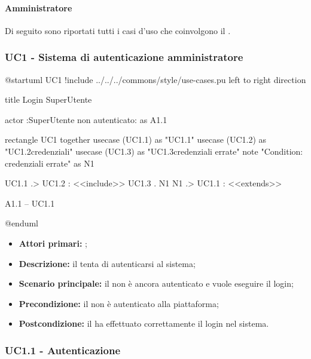 \documentclass[../analisi-dei-requisiti]{subfiles}
\begin{document}
\paragraph{Amministratore}
\label{par:amministratore}
Di seguito sono riportati tutti i casi d'uso che coinvolgono il  .


\subsubsection{UC1 - Sistema di autenticazione amministratore}
\label{subsub:UC1}


\begin{plantuml}
@startuml UC1
!include ../../../commons/style/use-cases.pu
left to right direction

title Login SuperUtente

actor :SuperUtente non autenticato: as A1.1

rectangle UC1{
  together {
  usecase (UC1.1) as "UC1.1\nAutenticazione"
  usecase (UC1.2) as "UC1.2\nVerifica credenziali"
  usecase (UC1.3) as "UC1.3\nVisualizzazione credenziali errate"
  note "Condition: credenziali errate" as N1
  }
}
  
UC1.1 .> UC1.2 : <<include>>
UC1.3 . N1
N1 .> UC1.1 : <<extends>>

A1.1 -- UC1.1


@enduml
\end{plantuml}


\begin{itemize}
\item \textbf{Attori primari:} ;
\item \textbf{Descrizione:} il  tenta di autenticarsi al sistema;
\item \textbf{Scenario principale:} il  non è ancora autenticato e vuole eseguire il login;
\item \textbf{Precondizione:} il  non è autenticato alla piattaforma;
\item \textbf{Postcondizione:} il  ha effettuato correttamente il login nel sistema.

\end{itemize}
\subsubsection{UC1.1 - Autenticazione}
\label{subsub:UC1.1}
\end{document}

